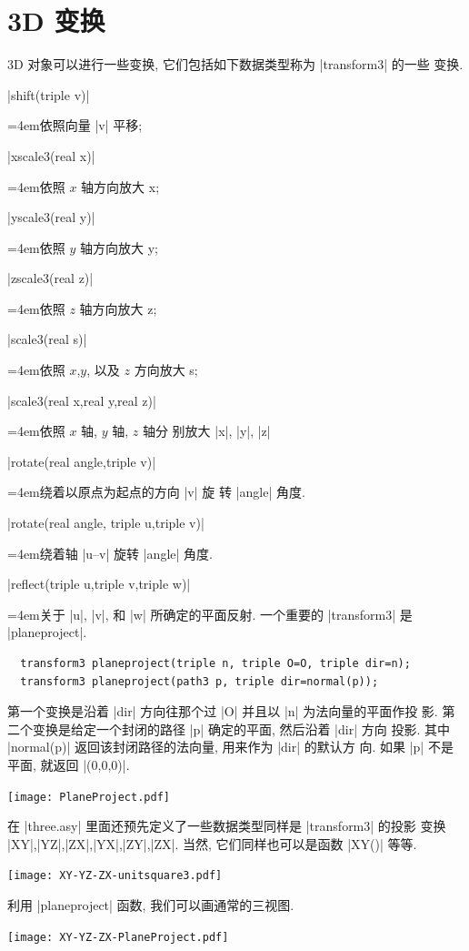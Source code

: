 \documentclass[nofonts,CJKnormalspaces]{ctexbook}
\newenvironment{funclist}{\trivlist
  \parindent=0pt
\item[]
  \def\item{\medskip\par\leftskip=0pt}
  \def\go{\par\leftskip=4em}}
{\endtrivlist}
\begin{document}
\section{3D 变换}
3D 对象可以进行一些变换, 它们包括如下数据类型称为 |transform3| 的一些
变换.
\begin{funclist}
\item |shift(triple v)| \go 依照向量 |v| 平移;
\item |xscale3(real x)| \go 依照 $x$ 轴方向放大 x;
\item |yscale3(real y)| \go 依照 $y$ 轴方向放大 y;
\item |zscale3(real z)| \go 依照 $z$ 轴方向放大 z;
\item |scale3(real s)|   \go 依照 $x$,$y$, 以及 $z$ 方向放大 s;
\item |scale3(real x,real y,real z)| \go 依照 $x$ 轴, $y$ 轴, $z$ 轴分
  别放大 |x|, |y|, |z|
\item |rotate(real angle,triple v)| \go 绕着以原点为起点的方向 |v| 旋
  转 |angle| 角度.
\item |rotate(real angle, triple u,triple v)| \go 绕着轴 |u--v| 旋转
  |angle| 角度.
\item |reflect(triple u,triple v,triple w)| \go 关于 |u|, |v|, 和 |w|
  所确定的平面反射.
\end{funclist}
一个重要的 |transform3| 是 |planeproject|.
\begin{lstlisting}
  transform3 planeproject(triple n, triple O=O, triple dir=n);
  transform3 planeproject(path3 p, triple dir=normal(p));
\end{lstlisting}
第一个变换是沿着 |dir| 方向往那个过 |O| 并且以 |n| 为法向量的平面作投
影. 第二个变换是给定一个封闭的路径 |p| 确定的平面, 然后沿着 |dir| 方向
投影. 其中 |normal(p)| 返回该封闭路径的法向量, 用来作为 |dir| 的默认方
向. 如果 |p| 不是平面, 就返回 |(0,0,0)|.
\begin{center}\texttt{[image: PlaneProject.pdf]}\end{center}%

在 |three.asy| 里面还预先定义了一些数据类型同样是 |transform3| 的投影
变换 |XY|,|YZ|,|ZX|,|YX|,|ZY|,|ZX|. 当然, 它们同样也可以是函数 |XY()|
等等.
\begin{center}\texttt{[image: XY-YZ-ZX-unitsquare3.pdf]}\end{center}%

利用 |planeproject| 函数, 我们可以画通常的三视图.
\begin{center}\texttt{[image: XY-YZ-ZX-PlaneProject.pdf]}\end{center}%

\end{document}
